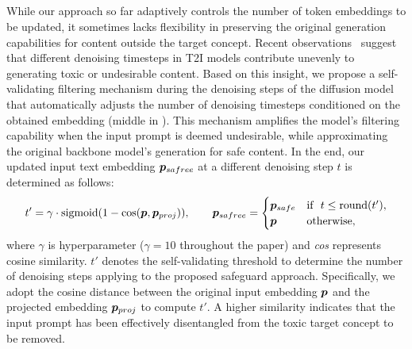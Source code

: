 \subsection{}\label{sec:subsec:selfvalid}
While our approach so far adaptively controls the number of token embeddings to be updated, it sometimes lacks flexibility in preserving the original generation capabilities for content outside the target concept. Recent observations~\citep{kim2024race,ban2024understanding} suggest that different denoising timesteps in T2I models contribute unevenly to generating toxic or undesirable content. Based on this insight, we propose a self-validating filtering mechanism during the denoising steps of the diffusion model that automatically adjusts the number of denoising timesteps conditioned on the obtained embedding (middle in ). This mechanism amplifies the model's filtering capability when the input prompt is deemed undesirable, while approximating the original backbone model's generation for safe content. In the end, our updated input text embedding $\boldsymbol{p}_{safree}$ at a different denoising step $t$ is determined as follows:
\begin{equation}
\begin{split}\label{eq:self-valid}
t'=\gamma\cdot\text{sigmoid}(1-\text{cos}(\boldsymbol{p}, \boldsymbol{p}_{proj})),\quad\quad
\boldsymbol{p}_{safree}=\begin{cases} \boldsymbol{p}_{safe} & \text{if}~~t\leq\text{round}(t'),\\
                     \boldsymbol{p} &  \text{otherwise},
       \end{cases}
\end{split}
\end{equation}
where $\gamma$ is hyperparameter ($\gamma=10$ throughout the paper) and \textit{cos} represents cosine similarity. $t'$ denotes the self-validating threshold to determine the number of denoising steps applying to the proposed safeguard approach. Specifically, we adopt the cosine distance between the original input embedding $\boldsymbol{p}$ and the projected embedding $\boldsymbol{p}_{proj}$ to compute $t'$.  A higher similarity indicates that the input prompt has been effectively disentangled from the toxic target concept to be removed. 

